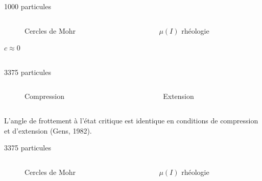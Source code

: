 \documentclass[10pt]{beamer}
\begin{document}
\begin{frame}{1000 particules}
    \begin{columns}
        \begin{column}{0.5\textwidth}
            \begin{figure}
                \centering
                \scalebox{0.4}{}
                \caption{Cercles de Mohr}
            \end{figure}

            $c \approx 0$
        \end{column}
        \begin{column}{0.5\textwidth}
            \begin{figure}
                \centering
                \scalebox{0.5}{}
                \caption{$\mu(I)$ rhéologie}
            \end{figure}
        \end{column}
    \end{columns}
\end{frame}

\begin{frame}{3375 particules}
    \begin{columns}
        \begin{column}{0.5\textwidth}
            \begin{figure}
                \centering
                \scalebox{0.5}{}
                \caption{Compression}
            \end{figure}
        \end{column}
        \begin{column}{0.5\textwidth}
            \begin{figure}
                \centering
                \scalebox{0.5}{}
                \caption{Extension}
            \end{figure}
        \end{column}
    \end{columns}
    L’angle de frottement à l’état critique est identique en conditions de compression et d’extension (Gens, 1982).
\end{frame}

\begin{frame}{3375 particules}
    \begin{columns}
        \begin{column}{0.5\textwidth}
            \begin{figure}[h]
                \centering
                \scalebox{0.4}{}
                \caption{Cercles de Mohr}
            \end{figure}
        \end{column}
        \begin{column}{0.5\textwidth}
            \begin{figure}[h]
                \centering
                \scalebox{0.5}{}
                \caption{$\mu(I)$ rhéologie}
            \end{figure}
        \end{column}
    \end{columns}
\end{frame}
\end{document}

